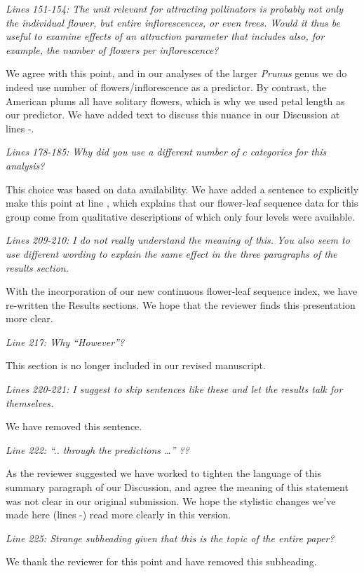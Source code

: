 \documentclass{article}[12pt]
\begin{document}
\emph{Lines 151-154: The unit relevant for attracting pollinators is probably not only the individual flower, but entire inflorescences, or even trees. Would it thus be useful to examine effects of an attraction parameter that includes also, for example, the number of flowers per inflorescence?}

We agree with this point, and in our analyses of the larger \emph{Prunus} genus we do indeed use number of flowers/inflorescence as a predictor. By contrast, the American plums all have solitary flowers, which is why we used petal length as our predictor. We have added text to discuss this nuance in our Discussion at lines -.

\emph{Lines 178-185: Why did you use a different number of c categories for this analysis?}

This choice was based on data availability. We have added a sentence to explicitly make this point at line , which explains that our flower-leaf sequence data for this group come from qualitative descriptions of which only four levels were available.

\emph{Lines 209-210: I do not really understand the meaning of this. You also seem to use different wording to explain the same effect in the three paragraphs of the results section.}

With the incorporation of our new continuous flower-leaf sequence index, we have re-written the Results sections. We hope that the reviewer finds this presentation more clear.

\emph{Line 217: Why “However”?}

This section is no longer included in our revised manuscript.

\emph{Lines 220-221: I suggest to skip sentences like these and let the results talk for themselves.}

We have removed this sentence.

\emph{Line 222: “.. through the predictions …” ??}

As the reviewer suggested we have worked to tighten the language of this summary paragraph of our Discussion, and agree the meaning of this statement was not clear in our original submission. We hope the stylistic changes we've made here (lines -) read more clearly in this version.

\emph{Line 225: Strange subheading given that this is the topic of the entire paper?}

We thank the reviewer for this point and have removed this subheading.
\end{document}
